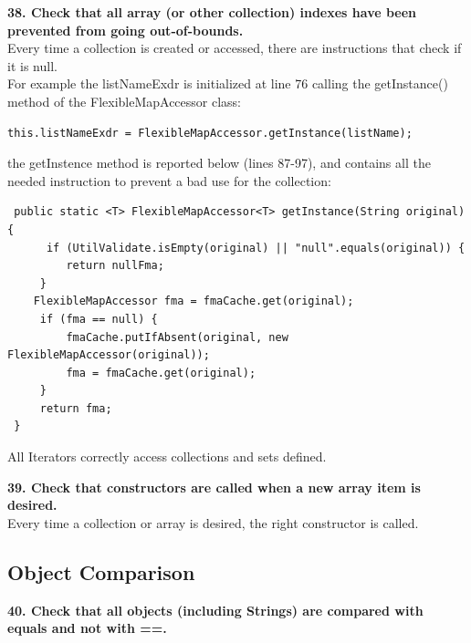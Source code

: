 \documentclass{article}
\begin{document}
\begin{flushleft}
\textbf{38. Check that all array (or other collection) indexes have been prevented from going out-of-bounds.}\\
\vspace{0.5cm}
Every time a collection is created or accessed, there are instructions that check if it is null. \\
\vspace{0.5cm}
For example the listNameExdr is initialized at line 76 calling the getInstance() method of the FlexibleMapAccessor class:\\
\vspace{0.5cm}
\begin{lstlisting}
this.listNameExdr = FlexibleMapAccessor.getInstance(listName); 
\end{lstlisting}
\vspace{0.5cm}
the getInstence method is reported below (lines 87-97), and contains all the needed instruction to prevent a bad use for the collection:\\
\vspace{0.5cm}
\begin{lstlisting}
 public static <T> FlexibleMapAccessor<T> getInstance(String original) {
      if (UtilValidate.isEmpty(original) || "null".equals(original)) {
         return nullFma;
     }
    FlexibleMapAccessor fma = fmaCache.get(original);
     if (fma == null) {
         fmaCache.putIfAbsent(original, new FlexibleMapAccessor(original));
         fma = fmaCache.get(original);
     }
     return fma;
 }
\end{lstlisting}    
 \vspace{0.5cm}   
All Iterators correctly access collections and sets defined.  \\ 
\vspace{0.5cm}
    
 \textbf{39. Check that constructors are called when a new array item is desired.}\\
 \vspace{0.5cm}
 Every time a collection or array is desired, the right constructor is called.\\
 \vspace{0.5cm}





\subsection{Object Comparison}
\textbf{40. Check that all objects (including Strings) are compared with equals and not with ==.}\\
\vspace{0.5cm}


\end{flushleft}
\end{document}
